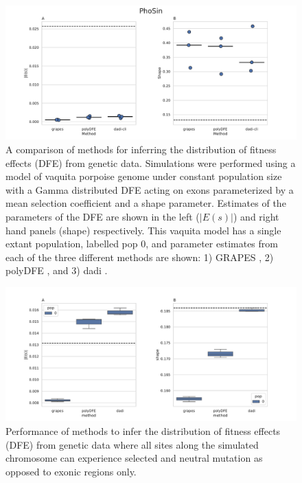 \documentclass[hidelinks]{article}
\begin{document}
\begin{figure}
    \centering
    \includegraphics[width=\textwidth]{figures/PhoSin/Constant/PhoSin_Constant_Gamma_R22_Phocoena_sinus.mPhoSin1.pri.110_exons_DFE_plot.pdf}
    \caption{
    \label{fig:vaquita-dfe.constant}
    A comparison of methods for inferring the distribution of fitness effects (DFE) from genetic data.
    Simulations were performed using a model of vaquita porpoise genome under constant population size with a Gamma distributed DFE
    acting on exons parameterized by a mean selection coefficient and a shape parameter. Estimates of the 
    parameters of the DFE are shown in the left ($\lvert E(s) \rvert $) and right hand panels (shape) respectively.
    This vaquita model has a single extant population, labelled pop 0, and parameter estimates from each
    of the three different methods are shown: 1) GRAPES \cite{galtier2016adaptive}, 2) polyDFE \citep{tataru2020polydfe},
    and 3) dadi \citep{gutenkunst2009inferring}.}
\end{figure}


\begin{figure}[h]
    \centering
    \includegraphics[width=\textwidth]{figures/HomSap/Constant/HomSap_Constant_Gamma_K17_all_sites_DFE_plot}
    \caption{
    \label{fig:homsap-dfe.constant.all_sites}
    Performance of methods to infer the distribution of fitness effects (DFE) from genetic data
    where all sites along the simulated chromosome can experience selected and neutral mutation
    as opposed to exonic regions only.
    }
\end{figure}
\end{document}
